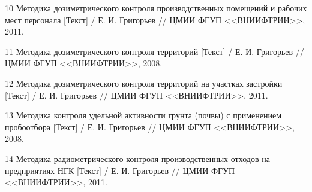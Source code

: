     10 Методика дозиметрического контроля производственных помещений и рабочих 
        мест персонала [Текст] / Е. И. Григорьев // ЦМИИ ФГУП <<ВНИИФТРИИ>>, 
        2011.

    11 Методика дозиметрического контроля территорий [Текст] / 
        Е. И. Григорьев // ЦМИИ ФГУП <<ВНИИФТРИИ>>, 2008.

    12 Методика дозиметрического контроля территорий на участках застройки 
        [Текст] / Е. И. Григорьев // ЦМИИ ФГУП <<ВНИИФТРИИ>>, 2011.

    13 Методика контроля удельной активности грунта (почвы) с применением 
        пробоотбора [Текст] / Е. И. Григорьев // ЦМИИ ФГУП <<ВНИИФТРИИ>>, 
        2008.

    14 Методика радиометрического контроля производственных отходов на 
        предприятиях НГК [Текст] / Е. И. Григорьев // ЦМИИ ФГУП <<ВНИИФТРИИ>>, 
        2011.